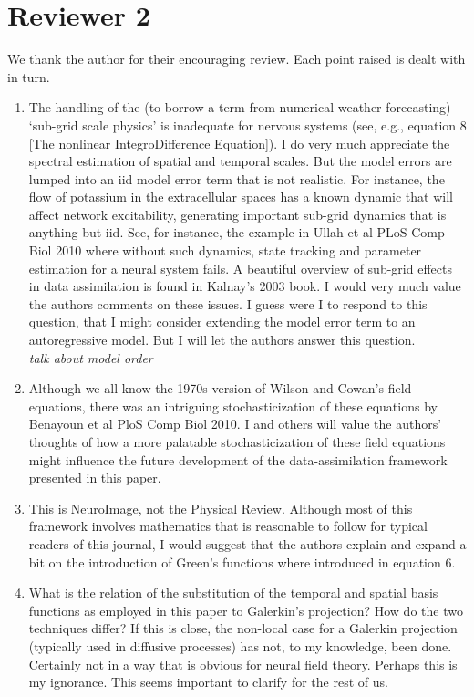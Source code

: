 \documentclass{article}
\begin{document}
    \section{Reviewer 2}
    
    We thank the author for their encouraging review. Each point raised is dealt with in turn.

\begin{enumerate}
    \item The handling of the (to borrow a term from numerical weather forecasting) `sub-grid scale physics' is inadequate for nervous systems (see, e.g., equation 8 [The nonlinear IntegroDifference Equation]). I do very much appreciate the spectral estimation of spatial and temporal scales. But the model errors are lumped into an iid model error term that is not realistic. For instance, the flow of potassium in the extracellular spaces has a known dynamic that will affect network excitability, generating important sub-grid dynamics that is anything but iid. See, for instance, the example in Ullah et al PLoS Comp Biol 2010 where without such dynamics, state tracking and parameter estimation for a neural system fails. A beautiful overview of sub-grid effects in data assimilation is found in Kalnay's 2003 book. I would very much value the authors comments on these issues. I guess were I to respond to this question, that I might consider extending the model error term to an autoregressive model. But I will let the authors answer this question.\\
    \emph{talk about model order}
\item Although we all know the 1970s version of Wilson and Cowan's field equations, there was an intriguing stochasticization of these equations by Benayoun et al PloS Comp Biol 2010. I and others will value the authors' thoughts of how a more palatable stochasticization of these field equations might influence the future development of the data-assimilation framework presented in this paper.
\item This is NeuroImage, not the Physical Review. Although most of this framework involves mathematics that is reasonable to follow for typical readers of this journal, I would suggest that the authors explain and expand a bit on the introduction of Green's functions where introduced in equation 6.
\item What is the relation of the substitution of the temporal and spatial basis functions as employed in this paper to Galerkin's projection? How do the two techniques differ? If this is close, the non-local case for a Galerkin projection (typically used in diffusive processes) has not, to my knowledge, been done. Certainly not in a way that is obvious for neural field theory. Perhaps this is my ignorance. This seems important to clarify for the rest of us.

\end{enumerate}
\end{document}
